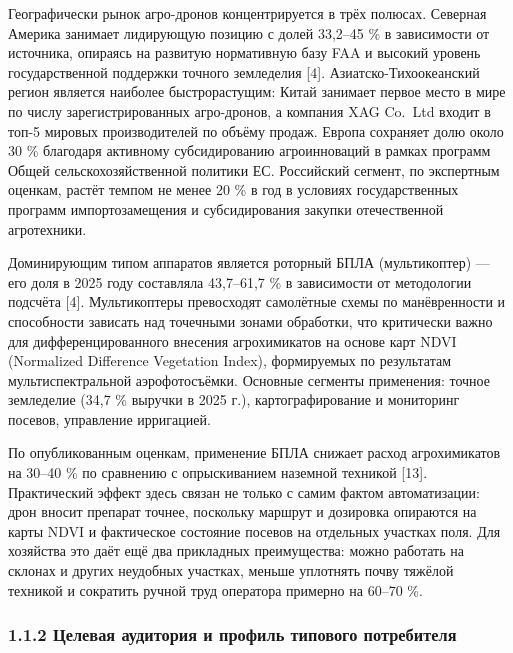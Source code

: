 \documentclass[14pt,a4paper]{extarticle}
\begin{document}
Географически рынок агро-дронов концентрируется в трёх полюсах. Северная Америка занимает лидирующую позицию с долей 33,2--45 \% в зависимости от источника, опираясь на развитую нормативную базу FAA и высокий уровень государственной поддержки точного земледелия {[}4{]}. Азиатско-Тихоокеанский регион является наиболее быстрорастущим: Китай занимает первое место в мире по числу зарегистрированных агро-дронов, а компания XAG Co.~Ltd входит в топ-5 мировых производителей по объёму продаж. Европа сохраняет долю около 30 \% благодаря активному субсидированию агроинноваций в рамках программ Общей сельскохозяйственной политики ЕС. Российский сегмент, по экспертным оценкам, растёт темпом не менее 20 \% в год в условиях государственных программ импортозамещения и субсидирования закупки отечественной агротехники.

Доминирующим типом аппаратов является роторный БПЛА (мультикоптер) --- его доля в 2025 году составляла 43,7--61,7 \% в зависимости от методологии подсчёта {[}4{]}. Мультикоптеры превосходят самолётные схемы по манёвренности и способности зависать над точечными зонами обработки, что критически важно для дифференцированного внесения агрохимикатов на основе карт NDVI (Normalized Difference Vegetation Index), формируемых по результатам мультиспектральной аэрофотосъёмки. Основные сегменты применения: точное земледелие (34,7 \% выручки в 2025 г.), картографирование и мониторинг посевов, управление ирригацией.

По опубликованным оценкам, применение БПЛА снижает расход агрохимикатов на 30--40 \% по сравнению с опрыскиванием наземной техникой {[}13{]}. Практический эффект здесь связан не только с самим фактом автоматизации: дрон вносит препарат точнее, поскольку маршрут и дозировка опираются на карты NDVI и фактическое состояние посевов на отдельных участках поля. Для хозяйства это даёт ещё два прикладных преимущества: можно работать на склонах и других неудобных участках, меньше уплотнять почву тяжёлой техникой и сократить ручной труд оператора примерно на 60--70 \%.

\hypertarget{ux446ux435ux43bux435ux432ux430ux44f-ux430ux443ux434ux438ux442ux43eux440ux438ux44f-ux438-ux43fux440ux43eux444ux438ux43bux44c-ux442ux438ux43fux43eux432ux43eux433ux43e-ux43fux43eux442ux440ux435ux431ux438ux442ux435ux43bux44f}{%
\subsubsection{1.1.2 Целевая аудитория и профиль типового потребителя}\label{ux446ux435ux43bux435ux432ux430ux44f-ux430ux443ux434ux438ux442ux43eux440ux438ux44f-ux438-ux43fux440ux43eux444ux438ux43bux44c-ux442ux438ux43fux43eux432ux43eux433ux43e-ux43fux43eux442ux440ux435ux431ux438ux442ux435ux43bux44f}}
\end{document}
